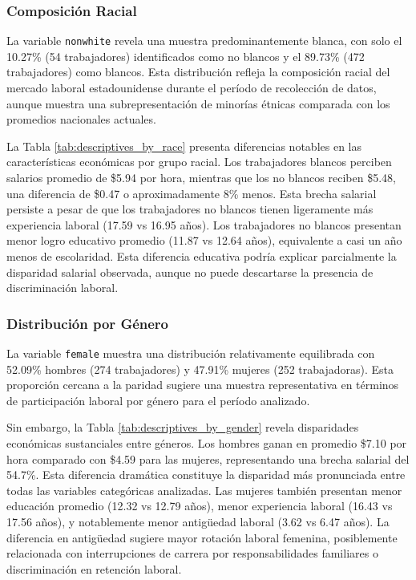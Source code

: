 \documentclass[12pt]{article}
\begin{document}

\label{tab:0201-nonwhite-freq}

\subsubsection*{Composición Racial}

La variable \texttt{nonwhite} revela una muestra predominantemente blanca, con solo el 10.27\% (54 trabajadores) identificados como no blancos y el 89.73\% (472 trabajadores) como blancos. Esta distribución refleja la composición racial del mercado laboral estadounidense durante el período de recolección de datos, aunque muestra una subrepresentación de minorías étnicas comparada con los promedios nacionales actuales.

La Tabla \ref{tab:descriptives_by_race} presenta diferencias notables en las características económicas por grupo racial. Los trabajadores blancos perciben salarios promedio de \$5.94 por hora, mientras que los no blancos reciben \$5.48, una diferencia de \$0.47 o aproximadamente 8\% menos. Esta brecha salarial persiste a pesar de que los trabajadores no blancos tienen ligeramente más experiencia laboral (17.59 vs 16.95 años). Los trabajadores no blancos presentan menor logro educativo promedio (11.87 vs 12.64 años), equivalente a casi un año menos de escolaridad. Esta diferencia educativa podría explicar parcialmente la disparidad salarial observada, aunque no puede descartarse la presencia de discriminación laboral.

\subsubsection*{Distribución por Género}

La variable \texttt{female} muestra una distribución relativamente equilibrada con 52.09\% hombres (274 trabajadores) y 47.91\% mujeres (252 trabajadoras). Esta proporción cercana a la paridad sugiere una muestra representativa en términos de participación laboral por género para el período analizado.

Sin embargo, la Tabla \ref{tab:descriptives_by_gender} revela disparidades económicas sustanciales entre géneros. Los hombres ganan en promedio \$7.10 por hora comparado con \$4.59 para las mujeres, representando una brecha salarial del 54.7\%. Esta diferencia dramática constituye la disparidad más pronunciada entre todas las variables categóricas analizadas. Las mujeres también presentan menor educación promedio (12.32 vs 12.79 años), menor experiencia laboral (16.43 vs 17.56 años), y notablemente menor antigüedad laboral (3.62 vs 6.47 años). La diferencia en antigüedad sugiere mayor rotación laboral femenina, posiblemente relacionada con interrupciones de carrera por responsabilidades familiares o discriminación en retención laboral.
\end{document}
